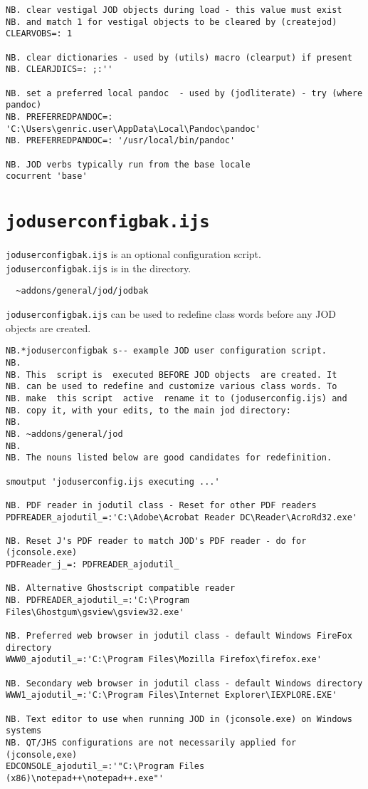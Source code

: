 \begin{lstlisting}[frame=single,framerule=0pt,basicstyle=\ttfamily\footnotesize]
NB. clear vestigal JOD objects during load - this value must exist
NB. and match 1 for vestigal objects to be cleared by (createjod)
CLEARVOBS=: 1

NB. clear dictionaries - used by (utils) macro (clearput) if present
NB. CLEARJDICS=: ;:''

NB. set a preferred local pandoc  - used by (jodliterate) - try (where pandoc)
NB. PREFERREDPANDOC=: 'C:\Users\genric.user\AppData\Local\Pandoc\pandoc'
NB. PREFERREDPANDOC=: '/usr/local/bin/pandoc'

NB. JOD verbs typically run from the base locale 
cocurrent 'base'
\end{lstlisting}

   \newpage
   \section{\texttt{joduserconfigbak.ijs}}\label{ap:jodusercfgbak}
   
\verb|joduserconfigbak.ijs| is an optional configuration 
script. \verb|joduserconfigbak.ijs| is in the directory.
\begin{verbatim}
  ~addons/general/jod/jodbak
\end{verbatim}
\verb|joduserconfigbak.ijs| can be used to redefine class words before
any JOD objects are created. 
   
\begin{lstlisting}[frame=single,framerule=0pt,basicstyle=\ttfamily\footnotesize]  
NB.*joduserconfigbak s-- example JOD user configuration script.
NB.
NB. This  script is  executed BEFORE JOD objects  are created. It
NB. can be used to redefine and customize various class words. To
NB. make  this script  active  rename it to (joduserconfig.ijs) and
NB. copy it, with your edits, to the main jod directory:
NB.
NB. ~addons/general/jod
NB.
NB. The nouns listed below are good candidates for redefinition.

smoutput 'joduserconfig.ijs executing ...'

NB. PDF reader in jodutil class - Reset for other PDF readers
PDFREADER_ajodutil_=:'C:\Adobe\Acrobat Reader DC\Reader\AcroRd32.exe'

NB. Reset J's PDF reader to match JOD's PDF reader - do for (jconsole.exe)
PDFReader_j_=: PDFREADER_ajodutil_

NB. Alternative Ghostscript compatible reader
NB. PDFREADER_ajodutil_=:'C:\Program Files\Ghostgum\gsview\gsview32.exe'

NB. Preferred web browser in jodutil class - default Windows FireFox directory
WWW0_ajodutil_=:'C:\Program Files\Mozilla Firefox\firefox.exe'

NB. Secondary web browser in jodutil class - default Windows directory
WWW1_ajodutil_=:'C:\Program Files\Internet Explorer\IEXPLORE.EXE'

NB. Text editor to use when running JOD in (jconsole.exe) on Windows systems
NB. QT/JHS configurations are not necessarily applied for (jconsole,exe)
EDCONSOLE_ajodutil_=:'"C:\Program Files (x86)\notepad++\notepad++.exe"'
\end{lstlisting}

